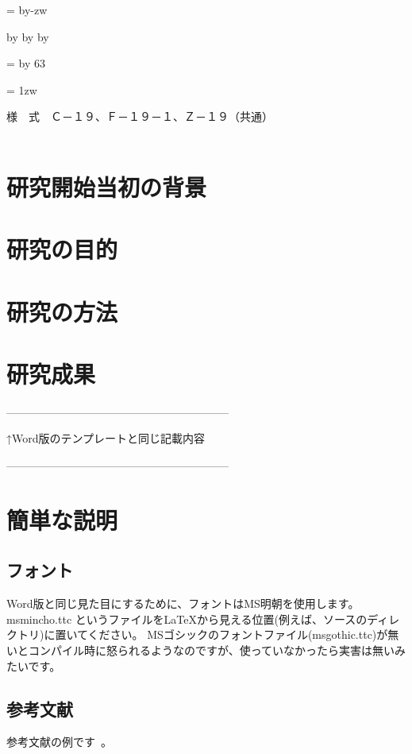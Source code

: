 \documentclass[uplatex,dvipdfmx,11pt]{jsarticle}
\makeatletter
\def\mojiparline#1{
    \newcounter{mpl}
    \setcounter{mpl}{#1}
    \@tempdima=\linewidth
    \advance\@tempdima by-\value{mpl}zw
    \addtocounter{mpl}{-1}
    \divide\@tempdima by \value{mpl}
    \advance\kanjiskip by\@tempdima
    \advance\parindent by\@tempdima
}
\def\linesparpage#1{
    \baselineskip=\textheight
    \divide\baselineskip by #1
}
\makeatother
\begin{document}
\mojiparline{43}
\linesparpage{63}

\parindent = 1zw

\noindent
様　式　Ｃ－１９、Ｆ－１９－１、Ｚ－１９（共通）\\ \\

\section{研究開始当初の背景}

\section{研究の目的}

\section{研究の方法}

\section{研究成果}

------------------------------------------------------------

↑Word版のテンプレートと同じ記載内容

------------------------------------------------------------

\section{簡単な説明}

\subsection{フォント}

Word版と同じ見た目にするために、フォントはMS明朝を使用します。
msmincho.ttc というファイルをLaTeXから見える位置(例えば、ソースのディレクトリ)に置いてください。
MSゴシックのフォントファイル(msgothic.ttc)が無いとコンパイル時に怒られるようなのですが、使っていなかったら実害は無いみたいです。

\subsection{参考文献}

参考文献の例です~\cite{dummy_ref1, dummy_ref2}。
\end{document}
